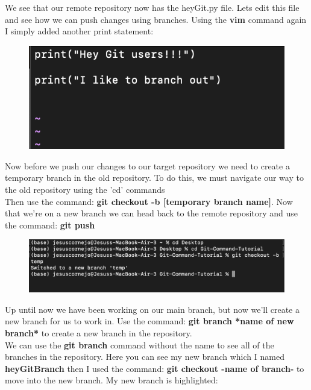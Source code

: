 \documentclass{article}
\begin{document}
We see that our remote repository now has the heyGit.py file. Lets edit this file and see how we can push changes using branches. Using the \textbf{vim} command again I simply added another print statement:
\begin{figure}[h]
\includegraphics[scale = 1]{screenshots/sc8.png}
\centering
\end{figure}


\newpage Now before we push our changes to our target repository we need to create a temporary branch in the old repository. To do this, we must navigate our way to the old repository using the 'cd' commands\\
Then use the command: \textbf{git checkout -b [temporary branch name]}. Now that we're on a new branch we can head back to the remote repository and use the command: \textbf{git push}\\

\begin{figure}[h]
\includegraphics[scale = 0.8]{screenshots/sc9.png}
\centering
\end{figure}

Up until now we have been working on our main branch, but now we'll create a new branch for us to work in. Use the command: \textbf{git branch *name of new branch*} to create a new branch in the repository.\\
We can use the \textbf{git branch} command without the name to see all of the branches in the repository. Here you can see my new branch which I named \textbf{heyGitBranch} then I used the command: \textbf{git checkout -name of branch-} to move into the new branch. My new branch is highlighted:\\
\end{document}
